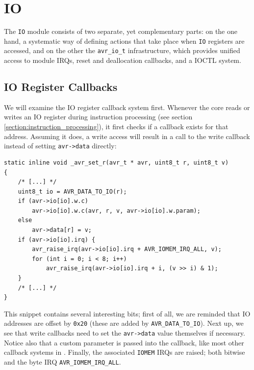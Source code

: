 \section{\acf{IO}}

The \lstinline|IO| module consists of two separate, yet complementary parts: on the one hand,
a systematic way of defining actions that take place when \lstinline|IO| registers
are accessed, and on the other the \lstinline|avr_io_t| infrastructure, which
provides unified access to module \acp{IRQ}, reset and deallocation callbacks,
and a \ac{IOCTL} system.

\subsection{\acf{IO} Register Callbacks}

We will examine the \ac{IO} register callback system first. Whenever the \simavr
core reads or writes an \ac{IO} register during instruction processing (see section
\ref{section:instruction_processing}), it first checks if a callback exists for
that address. Assuming it does, a write access will result in a call to the
write callback instead of setting \lstinline|avr->data| directly:

\begin{lstlisting}
static inline void _avr_set_r(avr_t * avr, uint8_t r, uint8_t v)
{
    /* [...] */
    uint8_t io = AVR_DATA_TO_IO(r);
    if (avr->io[io].w.c)
        avr->io[io].w.c(avr, r, v, avr->io[io].w.param);
    else
        avr->data[r] = v;
    if (avr->io[io].irq) {
        avr_raise_irq(avr->io[io].irq + AVR_IOMEM_IRQ_ALL, v);
        for (int i = 0; i < 8; i++)
            avr_raise_irq(avr->io[io].irq + i, (v >> i) & 1);
    }
    /* [...] */
}
\end{lstlisting}

This snippet contains several interesting bits; first of all, we are reminded that \ac{IO}
addresses are offset by \lstinline|0x20| (these are added by \lstinline|AVR_DATA_TO_IO|).
Next up, we see that write callbacks need to set the \lstinline|avr->data| value
themselves if necessary. Notice also that a custom parameter is passed into the callback,
like most other callback systems in \simavr. Finally, the associated \lstinline|IOMEM| \acp{IRQ} are
raised; both bitwise and the byte \ac{IRQ} \lstinline|AVR_IOMEM_IRQ_ALL|.

